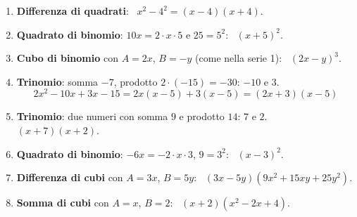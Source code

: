 \begin{question}[ID=1.2, subtitle={Scomposizione di polinomi — serie 2}, tags={scomposizione, prodotti notevoli}, difficulty=facile]
\begin{explanation}
\begin{enumerate}
\[\begin{aligned}
    3a^2+3ab+5a+5b &= 3a(a+b)+5(a+b) && \textcolor{gray}{\text{raccolgo $3a$ e $5$}}\\
    &= (3a+5)(a+b) && \textcolor{gray}{\text{raccolgo $(a+b)$}}
    \end{aligned}\]
    \item \textbf{Differenza di quadrati}: \ $x^2-4^2=(x-4)(x+4)$.
    \item \textbf{Quadrato di binomio}: $10x=2\cdot x\cdot5$ e $25=5^2$: \ $(x+5)^2$.
    \item \textbf{Cubo di binomio} con $A=2x$, $B=-y$ (come nella serie 1): \ $(2x-y)^3$.
    \item \textbf{Trinomio}: somma $-7$, prodotto $2\cdot(-15)=-30$: $-10$ e $3$.
    \[ 2x^2-10x+3x-15=2x(x-5)+3(x-5)=(2x+3)(x-5) \]
    \item \textbf{Trinomio}: due numeri con somma $9$ e prodotto $14$: $7$ e $2$. \ $(x+7)(x+2)$.
    \item \textbf{Quadrato di binomio}: $-6x=-2\cdot x\cdot3$, $9=3^2$: \ $(x-3)^2$.
    \item \textbf{Differenza di cubi} con $A=3x$, $B=5y$: \ $(3x-5y)(9x^2+15xy+25y^2)$.
    \item \textbf{Somma di cubi} con $A=x$, $B=2$: \ $(x+2)(x^2-2x+4)$.
\end{enumerate}
\end{explanation}
\end{question}
